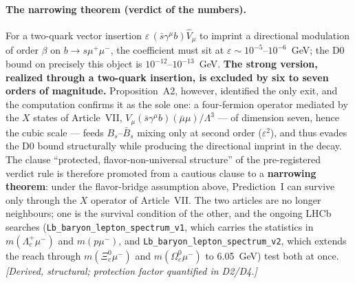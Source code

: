\paragraph{The narrowing theorem (verdict of the numbers).}
For a two-quark vector insertion $\varepsilon\,(\bar s\gamma^\mu b)\hat V_\mu$
to imprint a directional modulation of order $\beta$ on $b\to s\mu^+\mu^-$, the
coefficient must sit at $\varepsilon\sim10^{-5}\text{--}10^{-6}$~GeV; the D0
bound on precisely this object is $10^{-12}\text{--}10^{-13}$~GeV.
\textbf{The strong version, realized through a two-quark insertion, is excluded
by six to seven orders of magnitude.} Proposition~A2, however, identified the
only exit, and the computation confirms it as the sole one: a four-fermion
operator mediated by the $X$ states of Article~VII,
$V_\mu(\bar s\gamma^\mu b)(\bar\mu\mu)/\Lambda^3$ --- of dimension seven, hence
the cubic scale --- feeds $B_s$--$\bar B_s$ mixing only at second order
($\varepsilon^2$), and thus evades the D0 bound structurally while producing
the directional imprint in the decay. The clause ``protected,
flavor-non-universal structure'' of the pre-registered verdict rule is
therefore promoted from a cautious clause to a \textbf{narrowing theorem}:
under the flavor-bridge assumption above, Prediction~I can survive only through
the $X$ operator of Article~VII. The two articles are no longer neighbours; one
is the survival condition of the other, and the ongoing LHCb searches
(\texttt{Lb\_baryon\_lepton\_spectrum\_v1}, which carries the statistics in
$m(\Lambda_c^+\mu^-)$ and $m(p\mu^-)$, and
\texttt{Lb\_baryon\_lepton\_spectrum\_v2}, which extends the reach through
$m(\Xi_c^0\mu^-)$ and $m(\Omega_c^0\mu^-)$ to 6.05~GeV) test both at once.
\textit{[Derived, structural; protection factor quantified in D2/D4.]}

